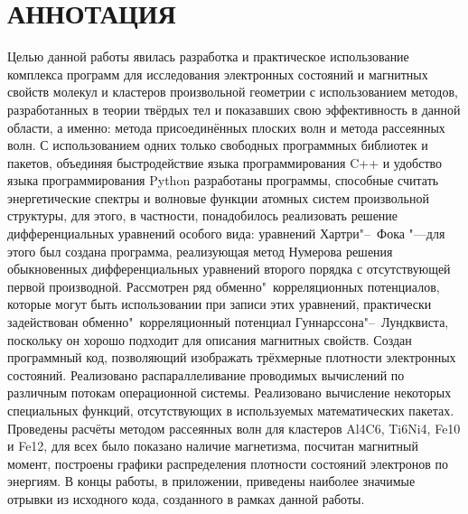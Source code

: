 \chapter*{АННОТАЦИЯ}
Целью данной работы явилась разработка и практическое использование комплекса программ для исследования электронных
состояний и магнитных свойств молекул и кластеров произвольной геометрии с использованием методов, разработанных в
теории твёрдых тел и показавших свою эффективность в данной области, а именно: метода присоединённых плоских волн и
метода рассеянных волн. С использованием одних только свободных программных библиотек и пакетов, объединяя
быстродействие языка программирования C++ и удобство языка программирования Python разработаны программы, способные
считать энергетические спектры и волновые функции атомных систем произвольной структуры, для этого, в частности,
понадобилось реализовать решение дифференциальных уравнений особого вида: уравнений Хартри"--~Фока "---для этого был создана
программа, реализующая метод Нумерова решения обыкновенных дифференциальных уравнений второго порядка с отсутствующей
первой производной. Рассмотрен ряд обменно"~корреляционных потенциалов, которые могут быть использовании при записи этих
уравнений, практически задействован обменно"~корреляционный потенциал Гуннарссона"--~Лундквиста, поскольку он хорошо
подходит для описания магнитных свойств. Создан программный код, позволяющий изображать трёхмерные плотности
электронных состояний. Реализовано распараллеливание проводимых вычислений по различным потокам операционной системы.
Реализовано вычисление некоторых специальных функций, отсутствующих в используемых математических пакетах. Проведены
расчёты методом рассеянных волн для кластеров Al4C6, Ti6Ni4, Fe10 и Fe12, для всех было показано наличие магнетизма,
посчитан магнитный момент, построены графики распределения плотности состояний электронов по энергиям. В концы работы,
в приложении, приведены наиболее значимые отрывки из исходного кода, созданного в рамках данной работы.
